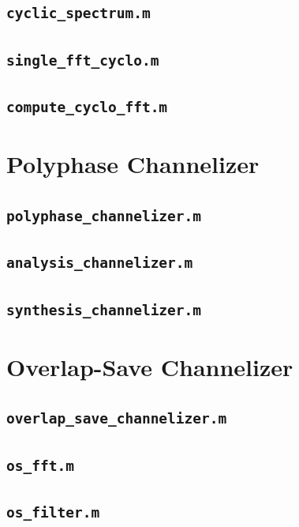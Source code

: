 \documentclass[12pt]{report}
\begin{document}
\subsection{\texttt{cyclic\_spectrum.m}}

\subsection{\texttt{single\_fft\_cyclo.m}}

\subsection{\texttt{compute\_cyclo\_fft.m}}


\section{Polyphase Channelizer}
\subsection{\texttt{polyphase\_channelizer.m}}

\subsection{\texttt{analysis\_channelizer.m}}

\subsection{\texttt{synthesis\_channelizer.m}}


\section{Overlap-Save Channelizer}
\subsection{\texttt{overlap\_save\_channelizer.m}}

\subsection{\texttt{os\_fft.m}}

\subsection{\texttt{os\_filter.m}}

\end{document}
